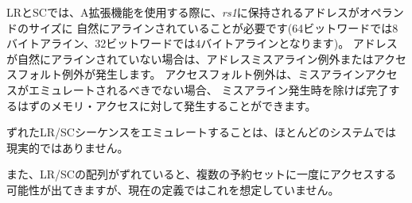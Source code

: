 \begin{comment}
For LR and SC, the A extension requires that the address held in {\em
  rs1} be naturally aligned to the size of the operand (i.e.,
eight-byte aligned for 64-bit words and four-byte aligned for 32-bit
words).  If the address is not naturally aligned, an address-misaligned
exception or an access-fault exception will be generated.  The access-fault
exception can be generated for a memory access that would otherwise be
able to complete except for the misalignment, if the misaligned access
should not be emulated.
\end{comment}

LRとSCでは、A拡張機能を使用する際に、{\em rs1}に保持されるアドレスがオペランドのサイズに
自然にアラインされていることが必要です(64ビットワードでは8バイトアライン、32ビットワードでは4バイトアラインとなります)。
アドレスが自然にアラインされていない場合は、アドレスミスアライン例外またはアクセスフォルト例外が発生します。
アクセスフォルト例外は、ミスアラインアクセスがエミュレートされるべきでない場合、
ミスアライン発生時を除けば完了するはずのメモリ・アクセスに対して発生することができます。

\begin{commentary}
\begin{comment}
Emulating misaligned LR/SC sequences is impractical in most systems.
\end{comment}

ずれたLR/SCシーケンスをエミュレートすることは、ほとんどのシステムでは現実的ではありません。

\begin{comment}
Misaligned LR/SC sequences also raise the possibility of accessing multiple
reservation sets at once, which present definitions do not provide for.
\end{comment}

また、LR/SCの配列がずれていると、複数の予約セットに一度にアクセスする可能性が出てきますが、現在の定義ではこれを想定していません。
\end{commentary}

\begin{comment}
An implementation can register an arbitrarily large reservation set on each
LR, provided the reservation set includes all bytes of the addressed data word
or doubleword.
An SC can only pair with the most recent LR in program order.
An SC may succeed only if no store from another hart
to the reservation set can be observed to have occurred between the LR
and the SC, and if there is no other SC between the LR and itself in program
order.
An SC may succeed only if no write from a device other than a hart
to the bytes accessed by the LR instruction can be observed to have occurred
between the LR and SC.
Note this LR might have had a different effective address and data size, but
reserved the SC's address as part of the reservation set.
\end{comment}

